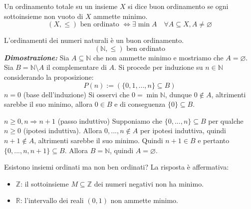 \documentclass[oneside]{book}
\begin{document}
\begin{tcolorbox}[colback=yellow!30, colframe=yellow!30!black, title=Insieme ben ordinato]
Un ordinamento totale su un insieme $X$ si dice buon ordinamento se ogni sottoinsieme
non vuoto di $X$ ammette minimo.
\[ (X,\leq) \text{ ben ordinato } \Longleftrightarrow \exists \min A \quad \forall A \subseteq X, A \not = \varnothing \]
\end{tcolorbox}

\begin{tcolorbox}[title={Buon ordinamento di $\mathbb{N}$}]
L'ordinamenti dei numeri naturali è un buon ordinamento.
\[ (\mathbb{N},\leq) \text{ ben ordinato} \]
\emph{\textbf{Dimostrazione:}} Sia $A \subseteq \mathbb{N}$ che non
ammette minimo e mostriamo che $A = \varnothing$.
Sia $B = \mathbb{N}\setminus A$ il complementare di $A$. Si procede per induzione su
$n \in \mathbb{N}$ considerando la proposizione:
\[ P(n) := \left(\{0,1,...,n\} \subseteq B\right) \]
$n=0$ (base dell'induzione) Si osservi che $0 = \min\mathbb{N}$, dunque
$0 \not \in A$, altrimenti sarebbe il suo minimo,
allora $0 \in B$ e di conseguenza $\{0\} \subseteq B$.

$n\geq0, n\Longrightarrow n+1$ (passo induttivo)
Supponiamo che $\{0,...,n\} \subseteq B$ per qualche $n\geq0$ (ipotesi
induttiva). Allora
$0,...,n \not \in A$ per ipotesi induttiva, quindi $n+1 \not \in A$,
altrimenti sarebbe il suo minimo. Quindi $n+1 \in B$ e pertanto
$\{0,...,n,n+1\} \subseteq B$. Allora $B = \mathbb{N}$, quindi
$A = \varnothing$.
\cvd
\end{tcolorbox}

Esistono insiemi ordinati ma non ben ordinati? La risposta è affermativa:
\begin{itemize}
    \item $\mathbb{Z}$: il sottoinsieme $M\subseteq \mathbb{Z}$ dei numeri negativi non ha minimo.
    \item $\mathbb{R}$: l'intervallo dei reali $(0,1)$ non ammette minimo.
\end{itemize}
\end{document}

